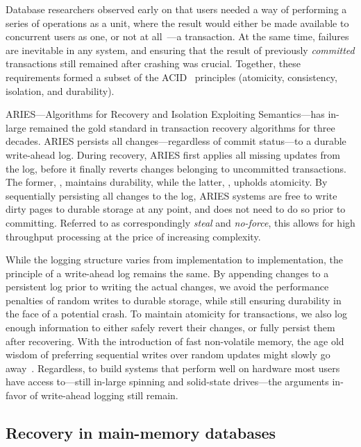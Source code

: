 Database researchers observed early on that users needed a way of
performing a series of operations as a unit, where the result would either be
made available to concurrent users as one, or not at all~\cite{bernstein}---a
transaction. At the same time, failures are inevitable in any system, and
ensuring that the result of previously \textit{committed} transactions still
remained after crashing was crucial. Together, these requirements formed
a subset of the ACID~\cite{acid} principles (atomicity, consistency, isolation,
and durability).

ARIES---Algorithms for Recovery and Isolation Exploiting
Semantics\cite{aries}---has in-large remained the gold standard in transaction
recovery algorithms for three decades. ARIES persists all changes---regardless
of commit status---to a durable write-ahead log. During recovery, ARIES first
applies all missing updates from the log, before it finally reverts changes
belonging to uncommitted transactions. The former, , maintains
durability, while the latter, , upholds atomicity. By sequentially
persisting all changes to the log, ARIES systems are free to write dirty pages
to durable storage at any point, and does not need to do so prior to committing.
Referred to as correspondingly \textit{steal} and \textit{no-force}, this allows
for high throughput processing at the price of increasing complexity.

While the logging structure varies from implementation to implementation, the
principle of a write-ahead log remains the same. By appending changes to a
persistent log prior to writing the actual changes, we avoid the performance
penalties of random writes to durable storage, while still ensuring durability
in the face of a potential crash. To maintain atomicity for transactions, we
also log enough information to either safely revert their changes, or fully
persist them after recovering. With the introduction of fast non-volatile
memory, the age old wisdom of preferring sequential writes over random updates
might slowly go away~\cite{mars, wbl}. Regardless, to build systems that perform
well on hardware most users have access to---still in-large spinning and
solid-state drives---the arguments in-favor of write-ahead logging still remain.

\subsection{Recovery in main-memory databases}


